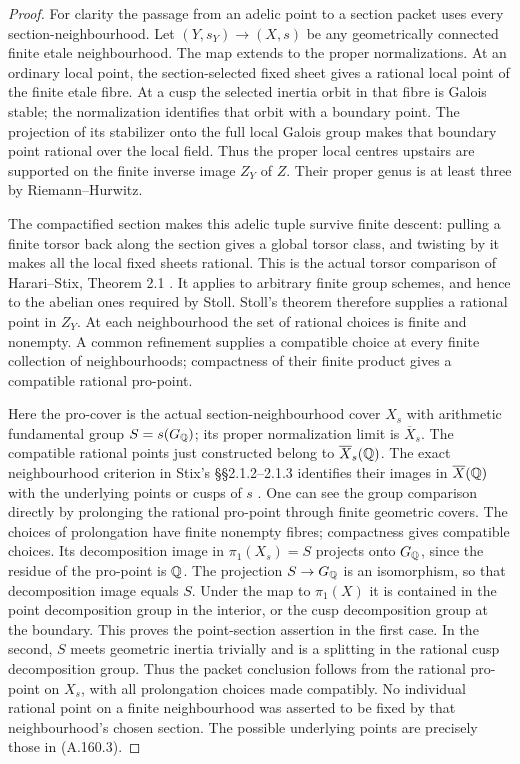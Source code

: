 \begin{proof}
For clarity the passage from an adelic point to a section
packet uses every section-neighbourhood.  Let
\((Y,s_Y)\to(X,s)\) be any geometrically connected finite
etale neighbourhood.  The map extends to the proper
normalizations.  At an ordinary local point, the
section-selected fixed sheet gives a rational local
point of the finite etale fibre.  At a cusp the selected
inertia orbit in that fibre is Galois stable; the
normalization identifies that orbit with a boundary point.
The projection of its stabilizer onto the full local
Galois group makes that boundary point rational over
the local field.  Thus the proper local centres upstairs
are supported on the finite inverse image \(Z_Y\) of
\(Z\).  Their proper genus is at least three by
Riemann--Hurwitz.

The compactified section makes this adelic tuple survive
finite descent: pulling a finite torsor back along the
section gives a global torsor class, and twisting by it
makes all the local fixed sheets rational.  This is the
actual torsor comparison of Harari--Stix, Theorem 2.1
\cite[Theorem 2.1 and unnumbered remark (1) following Theorem 2.1]{AgentHarariStix}.
It applies to arbitrary finite group schemes, and hence
to the abelian ones required by Stoll.  Stoll's theorem
therefore supplies a rational point in \(Z_Y\).
At each neighbourhood the set of rational choices is
finite and nonempty.  A common refinement supplies a
compatible choice at every finite collection of
neighbourhoods; compactness of their finite product gives
a compatible rational pro-point.

Here the pro-cover is the actual section-neighbourhood
cover \(X_s\) with arithmetic fundamental group
\(S=s(G_\mathbb Q)\); its proper normalization limit is
\(\overline X_s\).  The compatible rational points
just constructed belong to \(\overline X_s(\mathbb Q)\).
The exact neighbourhood criterion in Stix's
\S\S2.1.2--2.1.3 identifies their images in
\(\overline X(\mathbb Q)\) with the underlying points or
cusps of \(s\) \cite[\S\S2.1.2--2.1.3]{BIR_Stix2015}.
One can see the group comparison directly by prolonging
the rational pro-point through finite geometric covers.
The choices of prolongation have finite nonempty fibres;
compactness gives compatible choices.  Its decomposition
image in \(\pi_1(X_s)=S\) projects onto \(G_\mathbb Q\),
since the residue of the pro-point is \(\mathbb Q\).
The projection \(S\to G_\mathbb Q\) is an isomorphism, so
that decomposition image equals \(S\).  Under the map
to \(\pi_1(X)\) it is contained in the point
decomposition group in the interior, or the cusp
decomposition group at the boundary.  This proves the
point-section assertion in the first case.  In the second,
\(S\) meets geometric inertia trivially and is a
splitting in the rational cusp decomposition group.
Thus the packet conclusion follows from the rational
pro-point on \(X_s\), with all prolongation choices
made compatibly.  No individual rational point on a
finite neighbourhood was asserted to be fixed by that
neighbourhood's chosen section.  The possible underlying
points are precisely those in (A.160.3).


\end{proof}
